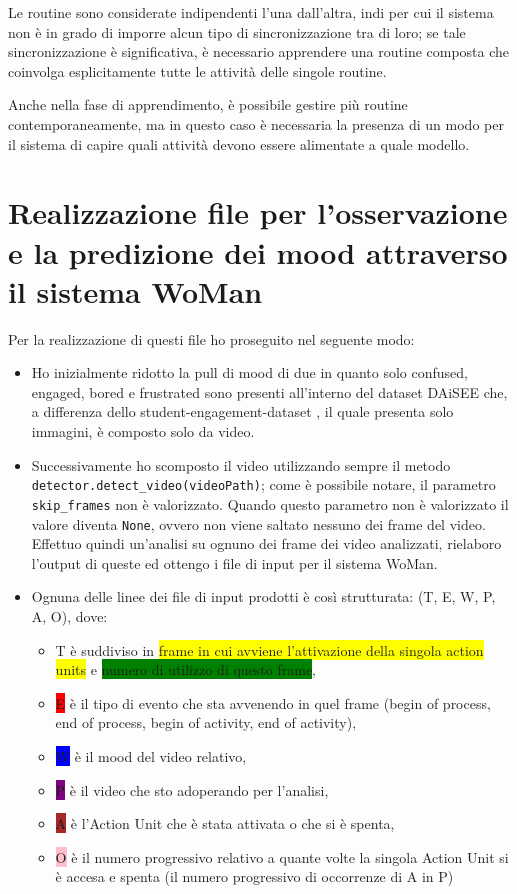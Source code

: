 Le routine sono considerate indipendenti l'una dall'altra, indi per cui il sistema non è in grado di imporre alcun tipo di sincronizzazione tra di loro; se tale sincronizzazione è significativa, è necessario apprendere una routine composta che coinvolga esplicitamente tutte le attività delle singole routine. 

Anche nella fase di apprendimento, è possibile gestire più routine contemporaneamente, ma in questo caso è necessaria la presenza di un modo per il sistema di capire quali attività devono essere alimentate a quale modello.

\section{Realizzazione file per l’osservazione e la predizione dei mood attraverso il sistema WoMan}

Per la realizzazione di questi file ho proseguito nel seguente modo:
\begin{itemize}
    \item Ho inizialmente ridotto la pull di mood di due in quanto solo confused, engaged, bored e frustrated sono presenti all’interno del dataset DAiSEE \cite{DAiSEE} che, a differenza dello student-engagement-dataset \cite{StudEngagDataset}, il quale presenta solo immagini, è composto solo da video.
    \item Successivamente ho scomposto il video utilizzando sempre il metodo \texttt{detector.detect_video(videoPath)}; come è possibile notare, il parametro \texttt{skip_frames} non è valorizzato. Quando questo parametro non è valorizzato il valore diventa \texttt{None}, ovvero non viene saltato nessuno dei frame del video.
    Effettuo quindi un’analisi su ognuno dei frame dei video analizzati, rielaboro l’output di queste ed ottengo i file di input per il sistema WoMan.
    \item Ognuna delle linee dei file di input prodotti è così strutturata: (T, E, W, P, A, O), dove: 
    \begin{itemize}
        \item T è suddiviso in \colorbox{yellow}{frame in cui avviene l'attivazione della singola action} \colorbox{yellow}{units} e \colorbox{green}{numero di utilizzo di questo frame},
        \item \colorbox{red}{E} è il tipo di evento che sta avvenendo in quel frame (begin of process, end of process, begin of activity, end of activity), 
        \item \colorbox{blue}{W} è il mood del video relativo,
        \item \colorbox{purple}{P} è il video che sto adoperando per l’analisi, 
        \item \colorbox{brown}{A} è l’Action Unit che è stata attivata o che si è spenta,
        \item \colorbox{pink}{O} è il numero progressivo relativo a quante volte la singola Action Unit si è accesa e spenta (il numero progressivo di occorrenze di A in P) 
    \end{itemize}
\end{itemize}

